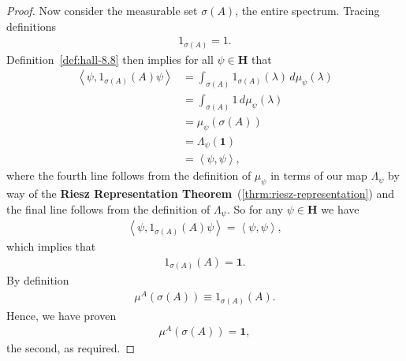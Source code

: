 \begin{proof}
Now consider the measurable set $\sigma(A)$, the entire spectrum. Tracing definitions
\begin{align}
    1_{\sigma(A)} = 1.
\end{align}
Definition~\ref{def:hall-8.8} then implies for all $\psi \in \mathbf{H}$ that
\begin{align}
    \left< \psi, 1_{\sigma(A)}(A)\psi \right> &= \int_{\sigma(A)} 1_{\sigma(A)}(\lambda) \, d\mu_\psi(\lambda) \\
                                              &= \int_{\sigma(A)} 1 \, d\mu_\psi(\lambda) \\
                                              &= \mu_\psi(\sigma(A)) \\
                                              &= \Lambda_\psi(\mathbf{1}) \\
                                              &= \left< \psi, \psi \right>,
\end{align}
where the fourth line follows from the definition of $\mu_\psi$ in terms of our map $\Lambda_\psi$ by way of the \textbf{Riesz Representation Theorem}~(\ref{thrm:riesz-representation}) and the final line follows from the definition of $\Lambda_\psi$. So for any $\psi \in \mathbf{H}$ we have
\begin{align}
    \left< \psi, 1_{\sigma(A)}(A)\psi \right> = \left< \psi, \psi \right>,
\end{align}
which implies that
\begin{align}
    1_{\sigma(A)}(A) = \mathbf{1}.
\end{align}
By definition
\begin{align}
    \mu^A(\sigma(A)) \equiv 1_{\sigma(A)}(A).
\end{align}
Hence, we have proven
\begin{align}
    \mu^A(\sigma(A)) = \mathbf{1},
\end{align}
the second, as required.
\end{proof}

